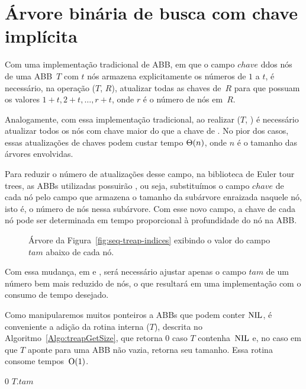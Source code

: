 \chapter{Árvore binária de busca com chave implícita}
\label{sec:TreapDeChaveImplicita}

Com uma implementação tradicional de ABB, em que o campo  $\mathit{chave}$ ddos nós de uma ABB~$T$ com $t$ nós armazena explicitamente os números de $1$ a $t$, é necessário, na operação \treapJoin($T$, $R$), atualizar todas as chaves de~$R$ para que possuam os valores $1+t,2+t, \ldots, r+t$, onde $r$ é o número de nós em~$R$.

Analogamente, com essa implementação tradicional, ao realizar \treapSplit($T$, ) é necessário atualizar todos os nós com chave maior do que a chave de .
No pior dos casos, essas atualizações de chaves podem custar tempo $\Theta(n)$, onde $n$ é o tamanho das árvores envolvidas.

Para reduzir o número de atualizações desse campo, na biblioteca de Euler tour trees, as ABBs utilizadas possuirão , ou seja, substituímos o campo $chave$ de cada nó pelo campo  que armazena o tamanho da subárvore enraizada naquele nó, isto é, o número de nós nessa subárvore.
Com esse novo campo, a chave de cada nó pode ser determinada em tempo proporcional à profundidade do nó na ABB.

\begin{figure}[htb]
\centering

\caption{Árvore da Figura~\ref{fig:seq-treap-indices} exibindo o valor do campo $tam$ abaixo de cada nó.}
\label{fig:seq-treap-size}
\end{figure}

\newpage
Com essa mudança, em \treapJoin{} e \treapSplit{}, será necessário ajustar apenas o campo $tam$ de um número bem mais reduzido de nós, o que resultará em uma implementação com o consumo de tempo desejado.

Como manipularemos muitos ponteiros a ABBs que podem conter $\text{NIL}$, é conveniente a adição da rotina interna \treapGetSize($T$), descrita no Algoritmo~\ref{Algo:treapGetSize}, que retorna $0$ caso $T$ contenha~$\text{NIL}$ e, no caso em que $T$ aponte para uma ABB não vazia, retorna seu tamanho. Essa rotina consome tempos~$\mathrm{O}(1)$.

\begin{algorithm}[!htb]
\caption{\treapGetSize($T$)}
\label{Algo:treapGetSize}
\begin{algorithmic}[1]
\State \Return $0$
\EndIf
\State \Return $T$.$tam$
\end{algorithmic}
\end{algorithm}

